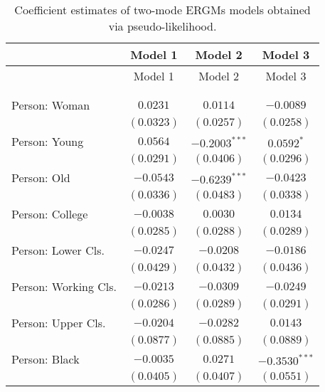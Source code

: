 
\begin{center}
\begin{longtable}{l c c c}
\toprule
 & Model 1 & Model 2 & Model 3 \\
\midrule
\endfirsthead
\toprule
 & Model 1 & Model 2 & Model 3 \\
\midrule
\endhead
\bottomrule
\endfoot
\bottomrule
\multicolumn{4}{l}{\scriptsize{$^{***}p<0.001$; $^{**}p<0.01$; $^{*}p<0.05$}}\\
\caption{Coefficient estimates of two-mode ERGMs models obtained via pseudo-likelihood.}
\label{tab:reg2}
\endlastfoot \\
Person: Woman              & $0.0231$       & $0.0114$        & $-0.0089$       \\
                           & $(0.0323)$     & $(0.0257)$      & $(0.0258)$      \\
Person: Young              & $0.0564$       & $-0.2003^{***}$ & $0.0592^{*}$    \\
                           & $(0.0291)$     & $(0.0406)$      & $(0.0296)$      \\
Person: Old                & $-0.0543$      & $-0.6239^{***}$ & $-0.0423$       \\
                           & $(0.0336)$     & $(0.0483)$      & $(0.0338)$      \\
Person: College            & $-0.0038$      & $0.0030$        & $0.0134$        \\
                           & $(0.0285)$     & $(0.0288)$      & $(0.0289)$      \\
Person: Lower Cls.         & $-0.0247$      & $-0.0208$       & $-0.0186$       \\
                           & $(0.0429)$     & $(0.0432)$      & $(0.0436)$      \\
Person: Working Cls.       & $-0.0213$      & $-0.0309$       & $-0.0249$       \\
                           & $(0.0286)$     & $(0.0289)$      & $(0.0291)$      \\
Person: Upper Cls.         & $-0.0204$      & $-0.0282$       & $0.0143$        \\
                           & $(0.0877)$     & $(0.0885)$      & $(0.0889)$      \\
Person: Black              & $-0.0035$      & $0.0271$        & $-0.3530^{***}$ \\
                           & $(0.0405)$     & $(0.0407)$      & $(0.0551)$      \\

\end{longtable}
\end{center}
